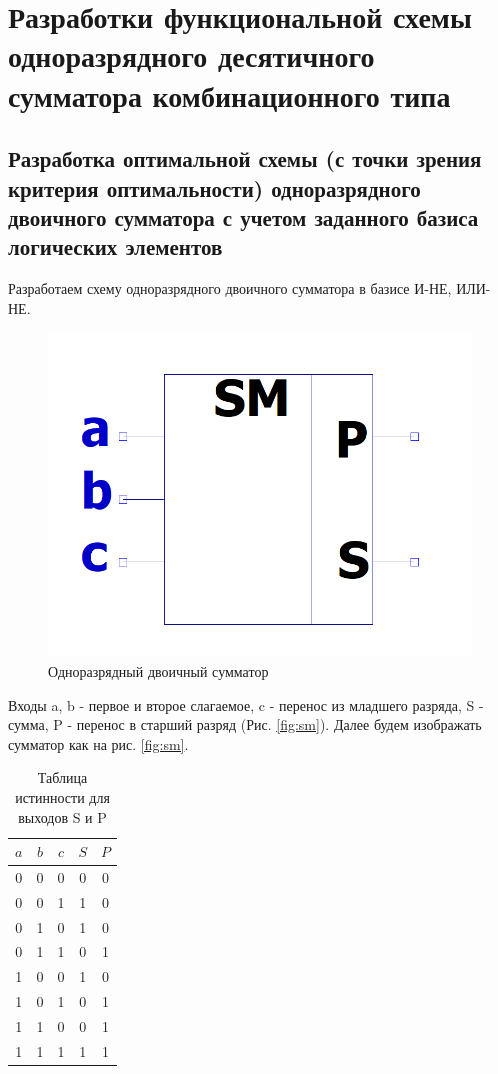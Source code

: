 \documentclass[a4paper,14pt]{article}
\begin{document}
\section{Разработки функциональной схемы одноразрядного десятичного сумматора комбинационного типа}

\subsection{Разработка оптимальной схемы (с точки зрения критерия оптимальности) одноразрядного двоичного сумматора с учетом заданного базиса логических элементов}

Разработаем схему одноразрядного двоичного сумматора в базисе И-НЕ, ИЛИ-НЕ.

\begin{figure}[H]
	\centering
	\includegraphics[width=0.3\linewidth]{schemas/sm_el}
	\caption{Одноразрядный двоичный сумматор}
	\label{fig:sm_el}
\end{figure}

Входы a, b - первое и второе слагаемое, c - перенос из младшего разряда, S - сумма, P - перенос в старший разряд (Рис. \ref{fig:sm}).
Далее будем изображать сумматор как на рис. \ref{fig:sm}.

\begin{table}[H]
	\begin{center}
		\caption{\label{tab:tab1} Таблица истинности для выходов S и P}
		\begin{tabular}{|c c c|c c|}
			\hline
			$a$ & $b$ & $c$ & $S$ & $P$ \\ \hline
			0 & 0 & 0 & 0 & 0 \\ 
			0 & 0 & 1 & 1 & 0 \\ 
			0 & 1 & 0 & 1 & 0 \\ 
			0 & 1 & 1 & 0 & 1 \\ 
			1 & 0 & 0 & 1 & 0 \\ 
			1 & 0 & 1 & 0 & 1 \\ 
			1 & 1 & 0 & 0 & 1 \\ 
			1 & 1 & 1 & 1 & 1 \\ \hline
		\end{tabular}
	\end{center}
\end{table}
\end{document}
